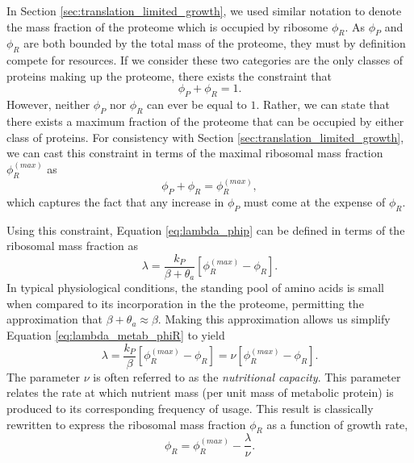 \documentclass[letterpaper, 11pt]{article}
\begin{document}
In Section \ref{sec:translation_limited_growth}, we used similar notation to
denote the mass fraction of the proteome which is occupied by ribosome $\phi_R$.
As $\phi_P$ and $\phi_R$ are both bounded by the total mass of the proteome,
they must by definition compete for resources. If we consider these two categories are the only classes 
of proteins making up the proteome, there exists the constraint that 
\begin{equation}
\phi_P + \phi_R = 1.
\end{equation}
However, neither $\phi_P$ nor $\phi_R$ can ever be equal to $1$. Rather, we can 
state that there exists a maximum fraction of the proteome that can be occupied
by either class of proteins. For consistency with Section
\ref{sec:translation_limited_growth}, we can cast this constraint in terms of 
the maximal ribosomal mass fraction $\phi_R^{(max)}$ as 
\begin{equation}  
\phi_P + \phi_R = \phi_R^{(max)},
\label{eq:phip_phir_constraint}
\end{equation}
which captures the fact that any increase in $\phi_P$ must come at the expense
of $\phi_R$. 

Using this constraint, Equation \eqref{eq:lambda_phip} can be defined in terms 
of the ribosomal mass fraction as 
\begin{equation}
\lambda = \frac{k_P}{\beta + \theta_a}\left[\phi_R^{(max)} - \phi_R\right].
\label{eq:lambda_metab_phiR}
\end{equation}
In typical physiological conditions, the standing pool of amino acids is small
when compared to its incorporation in the the proteome, permitting the
approximation that $\beta + \theta_a \approx \beta$. Making this approximation
allows us simplify Equation \ref{eq:lambda_metab_phiR} to yield 
\begin{equation}
\lambda = \frac{k_P}{\beta}\left[\phi_R^{(max)} - \phi_R\right] = \nu \left[\phi_R^{(max)} - \phi_R\right].
\label{eq:growth_law_nu}
\end{equation}
The parameter $\nu$ is often referred to as the \textit{nutritional capacity}.
This parameter relates the rate at which nutrient mass (per unit mass of
metabolic protein) is produced to its corresponding frequency of usage. This
result is classically rewritten to express the ribosomal mass fraction $\phi_R$ 
as a function of growth rate, 
\begin{equation}
\phi_R = \phi_R^{(max)} - \frac{\lambda}{\nu}.
\end{equation}
\end{document}
